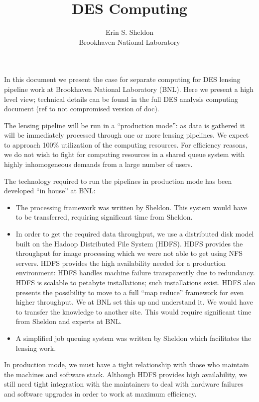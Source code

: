 \documentclass[12pt]{article}
\title{DES Computing}
\author{Erin S. Sheldon\\
Brookhaven National Laboratory}
\date{}
\begin{document}
\maketitle


In this document we present the case for separate computing for DES lensing
pipeline work at Brookhaven National Laboratory (BNL).  Here we present a high
level view; technical details can be found in the full DES analysis computing
document (ref to not compromised version of doc).

The lensing pipeline will be run in a ``production mode'': as data is gathered
it will be immediately processed through one or more lensing pipelines.  We
expect to approach 100\% utilization of the computing resources.  For
efficiency reasons, we do not wish to fight for computing resources in a shared
queue system with highly inhomogeneous demands from a large number of users.

The technology required to run the pipelines in production mode has been
developed ``in house'' at BNL:  
\begin{itemize}

    \item The processing framework was written by Sheldon. This system would
    have to be transferred, requiring significant time from Sheldon.

    \item In order to get the required data throughput, we use a distributed
    disk model built on the Hadoop Distributed File System (HDFS).  HDFS
    provides the throughput for image processing which we were not able to get
    using NFS servers. HDFS provides the high availability needed for a
    production environment: HDFS handles machine failure transparently due to
    redundancy.  HDFS is scalable to petabyte installations; such installations
    exist.  HDFS also presents the possibility to move to a full ``map reduce''
    framework for even higher throughput.  We at BNL set this up and understand
    it. We would have to transfer the knowledge to another site.  This would
    require significant time from Sheldon and experts at BNL.
    
    \item A simplified job queuing system was written by Sheldon which
    facilitates the lensing work.

\end{itemize}

In production mode, we must have a tight relationship with those who maintain
the machines and software stack.  Although HDFS provides high availability, we
still need tight integration with the maintainers to deal with hardware
failures and software upgrades in order to work at maximum efficiency.  
\end{document}
